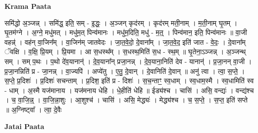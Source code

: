 \documentclass[17pt]{extarticle}
\begin{document}
\textbf{Krama Paata} \newline

समि॑द्धो अ॒ञ्जन्न् । समि॑द्ध॒ इति॒ सम् - इ॒द्धः॒ । अ॒ञ्जन् कृद॑रम् । कृद॑रम् मती॒नाम् । म॒ती॒नाम् घृ॒तम् । घृ॒तम॑ग्ने । अ॒ग्ने॒ मधु॑मत् । मधु॑म॒त् पिन्व॑मानः । मधु॑म॒दिति॒ मधु॑ - म॒त्॒ । पिन्व॑मान॒ इति॒ पिन्व॑मानः ॥ वा॒जी वहन्न्॑ । वह॑न् वा॒जिन᳚म् । वा॒जिन॑म् जातवेदः । जा॒त॒वे॒दो॒ दे॒वाना᳚म् । जा॒त॒वे॒द॒ इति॑ जात - वे॒दः॒ । दे॒वाना᳚म् ॅवक्षि । व॒क्षि॒ प्रि॒यम् । प्रि॒यमा । आ स॒धस्थ᳚म् । स॒धस्थ॒मिति॑ स॒ध - स्थ॒म् ॥ घृ॒तेना॒ऽञ्जन्न् । अ॒ञ्जन्थ् सम् । सम् प॒थः । प॒थो दे॑व॒यानान्॑ । दे॒व॒याना᳚न् प्रजा॒नन्न् । दे॒व॒याना॒निति॑ देव - यानान्॑ । प्र॒जा॒नन् वा॒जी । प्र॒जा॒नन्निति॑ प्र - जा॒नन्न् । वा॒ज्यपि॑ । अप्ये॑तु । ए॒तु॒ दे॒वान् । दे॒वानिति॑ दे॒वान् ॥ अनु॑ त्वा । त्वा॒ स॒प्ते॒ । स॒प्ते॒ प्र॒दिशः॑ । प्र॒दिशः॑ सचन्ताम् । प्र॒दिश॒ इति॑ प्र - दिशः॑ । स॒च॒न्ताꣳ॒॒ स्व॒धाम् । स्व॒धाम॒स्मै । स्व॒धामिति॑ स्व - धाम् । अ॒स्मै यज॑मानाय । यज॑मनाय धेहि । धे॒हीति॑ धेहि ॥ ईड्य॑श्च । चासि॑ । असि॒ वन्द्यः॑ । वन्द्य॑श्च । च॒ वा॒जि॒न्न्॒ । वा॒जि॒न्ना॒शुः । आ॒शुश्च॑ । चासि॑ । असि॒ मेद्ध्यः॑ । मेद्ध्य॑श्च । च॒ स॒प्ते॒ । स॒प्त॒ इति॑ सप्ते ॥ अ॒ग्निष्ट्वा᳚ । त्वा॒ दे॒वैः \newline

\textbf{Jatai Paata} \newline
\end{document}
